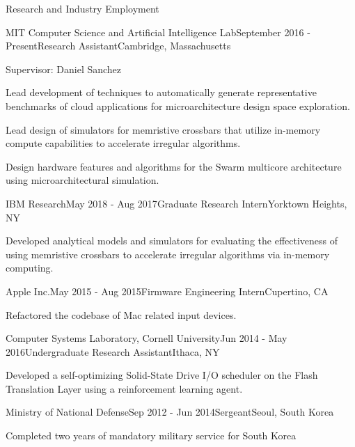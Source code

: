 \documentclass{resume} %
\begin{document}
\begin{rSection}{Research and Industry Employment}

\begin{rSubsection}{MIT Computer Science and Artificial Intelligence Lab}{September 2016 - Present}{Research Assistant}{Cambridge, Massachusetts}

\item Supervisor: Daniel Sanchez
\item Lead development of techniques to automatically generate representative benchmarks of cloud applications 
for microarchitecture design space exploration.
\item Lead design of simulators for memristive crossbars that utilize in-memory compute capabilities to accelerate irregular algorithms.
\item Design hardware features and algorithms for the Swarm multicore architecture using microarchitectural simulation.
\end{rSubsection}

\begin{rSubsection}{IBM Research}{May 2018 - Aug 2017}{Graduate Research Intern}{Yorktown Heights, NY}

\item Developed analytical models and simulators for evaluating the effectiveness of using memristive crossbars
to accelerate irregular algorithms via in-memory computing.
\end{rSubsection}

\begin{rSubsection}{Apple Inc.}{May 2015 - Aug 2015}{Firmware Engineering Intern}{Cupertino, CA}

\item Refactored the codebase of Mac related input devices. 
\end{rSubsection}

\begin{rSubsection}{Computer Systems Laboratory, Cornell University}{Jun 2014 - May 2016}{Undergraduate Research Assistant}{Ithaca, NY}

\item Developed a self-optimizing Solid-State Drive I/O scheduler on the Flash Translation Layer using a reinforcement learning agent. 
\end{rSubsection}

\begin{rSubsection}{Ministry of National Defense}{Sep 2012 - Jun 2014}{Sergeant}{Seoul, South Korea}

\item Completed two years of mandatory military service for South Korea
\end{rSubsection}

\end{rSection}
\end{document}
